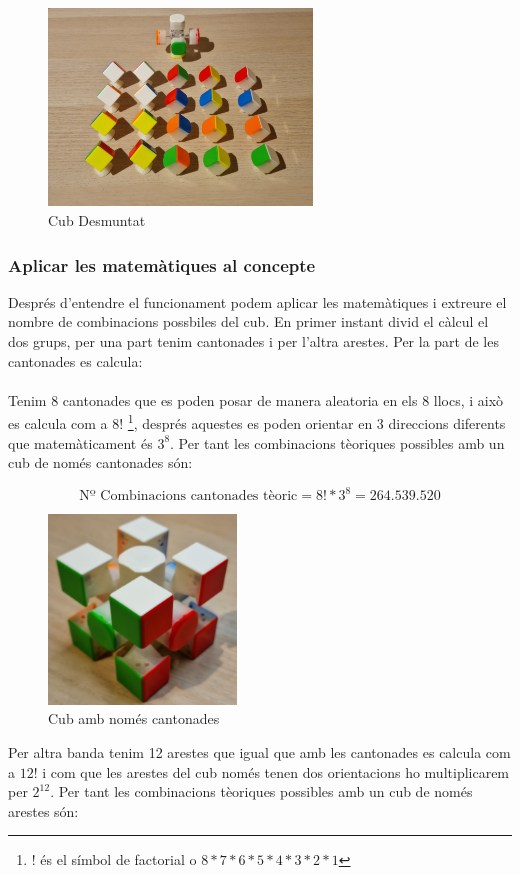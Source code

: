 \begin{figure}[ht]
    \centering
    \includegraphics[width=7cm]{img/figures/cub-desmontat.jpg}
    \caption{Cub Desmuntat}
    \label{fig:cub-desmuntat}
\end{figure}

\subsubsection{Aplicar les matemàtiques al concepte}

Després d'entendre el funcionament podem aplicar les matemàtiques i extreure el nombre de combinacions possbiles del cub. En primer instant divid el càlcul el dos grups, per una part tenim cantonades i per l'altra arestes.
Per la part de les cantonades es calcula:
\\\\Tenim 8 cantonades que es poden posar de manera aleatoria en els 8 llocs, i això es calcula com a $ 8! $ \footnote{! és el símbol de factorial o $8*7*6*5*4*3*2*1$}, després aquestes es poden orientar en 3 direccions diferents que matemàticament és $ 3^8 $. Per tant les combinacions tèoriques possibles amb un cub de només cantonades són:

$$ \textrm{Nº Combinacions cantonades tèoric} = 8!*3^8 = 264.539.520 $$

\begin{figure}[ht]
    \centering
    \includegraphics[width=5cm]{img/figures/only-corners.jpg}
    \caption{Cub amb només cantonades}
    \label{fig:only-corners}
\end{figure}
Per altra banda tenim 12 arestes que igual que amb les cantonades es calcula com a $ 12! $ i com que les arestes del cub només tenen dos orientacions ho multiplicarem per $2^12$. Per tant les combinacions tèoriques possibles amb un cub de només arestes són:  

